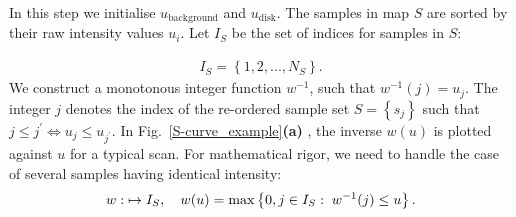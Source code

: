 \documentclass{aa}
\newcommand{\fg}[1]{\textcolor{midblue}{#1}}
\newcommand{\skk}[1]{\textcolor{midorange}{[SKK: #1]}} %
\newcommand{\eqnl}[2]{\begin{eqnarray}\label{#1}#2\end{eqnarray}}
\renewcommand{\max}[1]{\operatorname{max} \left\{ #1 \right\}}
\newcommand{\s}[2]{{#1}_{\mathrm{#2}}}
\begin{document}

  In this step we initialise $\s{u}{background}$ and $\s{u}{disk}$. The samples in map $S$ are sorted by their raw 
  intensity values $u_i$. 
 Let $I_S$ be the set of indices for samples in $S$:


  \eqnl{S-curve_indices}{
  I_S = \left\{ 1, 2, ..., N_S \right\} \text{.}
  }
  We construct a monotonous integer function $w^{-1}$, such that
  $w^{-1}(j) = u_j$.
  The integer $j$ denotes the index of the re-ordered sample set $S = \left\{ s_j \right\}$ such
  that $j \le j^{\prime} \Leftrightarrow u_{j} \le u_{j^{\prime}}.$
  In Fig.~\ref{S-curve_example}{\bf(a)} , the inverse $w(u)$ is plotted against
  $u$ for a typical scan. For mathematical rigor, we need to handle the case of several samples having identical intensity:
  \eqnl{scurve-inverse-rigor}{
  w:\;\real \mapsto I_S, \quad w(u) = \max{0, j \in I_S:\; w^{-1}(j) \le u} \text{.}
  }


\end{document}
